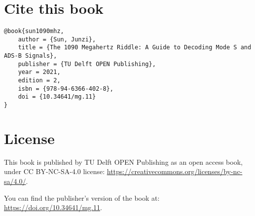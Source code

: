 




\chapter{Cite this book}

\begin{verbatim}
@book{sun1090mhz,
    author = {Sun, Junzi}, 
    title = {The 1090 Megahertz Riddle: A Guide to Decoding Mode S and ADS-B Signals},
    publisher = {TU Delft OPEN Publishing},
    year = 2021,
    edition = 2,
    isbn = {978-94-6366-402-8},
    doi = {10.34641/mg.11}
}
\end{verbatim}


\chapter{License}

This book is published by TU Delft OPEN Publishing as an open access book, under CC BY-NC-SA-4.0 license: \url{https://creativecommons.org/licenses/by-nc-sa/4.0/}.

You can find the publisher's version of the book at: \url{https://doi.org/10.34641/mg.11}.
